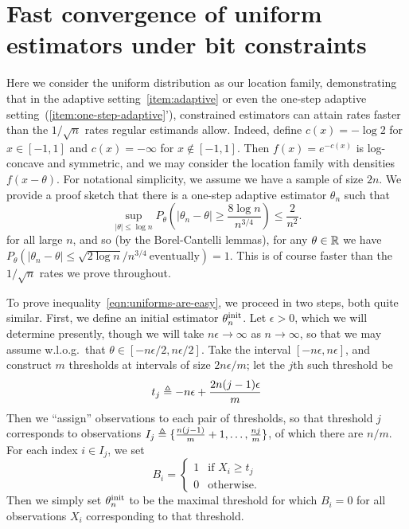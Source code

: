 
\section{Fast convergence of uniform estimators under bit constraints}
\label{sec:uniform-weirdos}

Here we consider the uniform distribution as our location family,
demonstrating that in the adaptive setting~\eqref{item:adaptive} or even the
one-step adaptive setting~(\ref{item:one-step-adaptive}'), constrained
estimators can attain rates faster than the $1 / \sqrt{n}$ rates regular
estimands allow. Indeed, define $c(x) = -\log 2$ for $x \in [-1, 1]$ and
$c(x) = -\infty$ for $x \not \in [-1, 1]$. Then $f(x) = e^{-c(x)}$ is
log-concave and symmetric, and we may consider the location family with
densities $f(x - \theta)$. For notational simplicity, we assume we have
a sample of size $2n$. We provide a proof sketch that
there is a one-step adaptive estimator $\theta_n$ such that
\begin{equation}
  \label{eqn:uniforms-are-easy}
  \sup_{|\theta| \le \log n}
  P_\theta\left(|\theta_n - \theta| \ge \frac{8 \log n}{n^{3/4}}\right)
  \le \frac{2}{n^2}.
\end{equation}
for all large $n$,
and so (by the Borel-Cantelli lemmas), for any $\theta \in \mathbb{R}$ we have
$P_\theta(|\theta_n - \theta| \le \sqrt{2 \log n} / n^{3/4} ~
\mbox{eventually}) = 1$. This is of course faster than the $1/\sqrt{n}$
rates we prove throughout.

To prove inequality~\eqref{eqn:uniforms-are-easy}, we proceed in two steps,
both quite similar.
First, we define an initial estimator $\theta^{\textup{init}}_n$.
Let $\epsilon > 0$, which we will determine presently, though we will
take $n \epsilon \to \infty$ as $n \to \infty$, so that we may assume
w.l.o.g.\ that $\theta \in [-n\epsilon/2, n \epsilon/2]$. Take the interval
$[-n\epsilon, n\epsilon]$, and construct
$m$ thresholds at intervals of size $2 n \epsilon / m$; let
the $j$th such threshold be
\begin{equation*}
  t_j \triangleq -n \epsilon + \frac{2 n (j-1) \epsilon}{m}
\end{equation*}
Then we ``assign'' observations to each pair of thresholds, so that
threshold $j$ corresponds to observations $I_j \triangleq \{\frac{n (j - 1)}{m}
+ 1, \ldots, \frac{n j}{m}\}$, of which there are $n/m$.  For each index $i
\in I_j$, we set
\begin{equation*}
  B_i = \begin{cases}
    1 & \mbox{if~} X_i \ge t_j \\
    0 & \mbox{otherwise}.
  \end{cases}
\end{equation*}
Then we simply set $\theta_n^{\textup{init}}$ to be the maximal threshold for which
$B_i = 0$ for all observations $X_i$ corresponding to that threshold.

